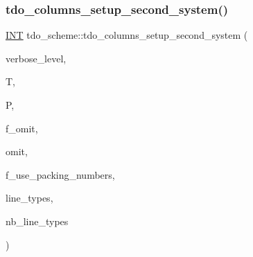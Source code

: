 \subsubsection{\texorpdfstring{tdo\+\_\+columns\+\_\+setup\+\_\+second\+\_\+system()}{tdo\_columns\_setup\_second\_system()}}
{\footnotesize\ttfamily \mbox{\hyperlink{galois_8h_a09fddde158a3a20bd2dcadb609de11dc}{I\+NT}} tdo\+\_\+scheme\+::tdo\+\_\+columns\+\_\+setup\+\_\+second\+\_\+system (\begin{DoxyParamCaption}\item[{\mbox{\hyperlink{galois_8h_a09fddde158a3a20bd2dcadb609de11dc}{I\+NT}}}]{verbose\+\_\+level,  }\item[{\mbox{\hyperlink{classtdo__data}{tdo\+\_\+data}} \&}]{T,  }\item[{\mbox{\hyperlink{classpartitionstack}{partitionstack}} \&}]{P,  }\item[{\mbox{\hyperlink{galois_8h_a09fddde158a3a20bd2dcadb609de11dc}{I\+NT}}}]{f\+\_\+omit,  }\item[{\mbox{\hyperlink{galois_8h_a09fddde158a3a20bd2dcadb609de11dc}{I\+NT}}}]{omit,  }\item[{\mbox{\hyperlink{galois_8h_a09fddde158a3a20bd2dcadb609de11dc}{I\+NT}}}]{f\+\_\+use\+\_\+packing\+\_\+numbers,  }\item[{\mbox{\hyperlink{galois_8h_a09fddde158a3a20bd2dcadb609de11dc}{I\+NT}} $\ast$\&}]{line\+\_\+types,  }\item[{\mbox{\hyperlink{galois_8h_a09fddde158a3a20bd2dcadb609de11dc}{I\+NT}} \&}]{nb\+\_\+line\+\_\+types }\end{DoxyParamCaption})}

\mbox{\label{classtdo__scheme_ac4c60a65dc8252a6cd264882de47c1ae}} 
